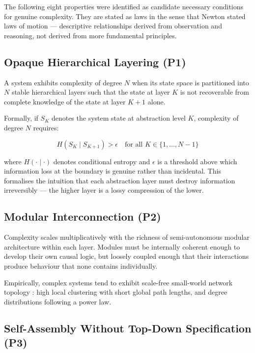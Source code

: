 \documentclass[12pt,a4paper]{article}
\begin{document}
The following eight properties were identified as candidate necessary
conditions for genuine complexity.
They are stated as laws in the sense that Newton stated laws of motion —
descriptive relationships derived from observation and reasoning, not
derived from more fundamental principles.

\subsection{Opaque Hierarchical Layering (P1)}

A system exhibits complexity of degree $N$ when its state space is
partitioned into $N$ stable hierarchical layers such that the state at
layer $K$ is not recoverable from complete knowledge of the state at
layer $K+1$ alone.

Formally, if $S_K$ denotes the system state at abstraction level $K$,
complexity of degree $N$ requires:

\begin{equation}
H(S_K \mid S_{K+1}) > \epsilon \quad \text{for all } K \in \{1, \ldots, N-1\}
\end{equation}

where $H(\cdot \mid \cdot)$ denotes conditional entropy and $\epsilon$
is a threshold above which information loss at the boundary is genuine
rather than incidental.
This formalises the intuition that each abstraction layer must destroy
information irreversibly — the higher layer is a lossy compression of
the lower.

\subsection{Modular Interconnection (P2)}

Complexity scales multiplicatively with the richness of semi-autonomous
modular architecture within each layer.
Modules must be internally coherent enough to develop their own causal
logic, but loosely coupled enough that their interactions produce
behaviour that none contains individually.

Empirically, complex systems tend to exhibit scale-free small-world
network topology \citep{watts1998, barabasi1999}: high local clustering
with short global path lengths, and degree distributions following a
power law.

\subsection{Self-Assembly Without Top-Down Specification (P3)}
\end{document}
